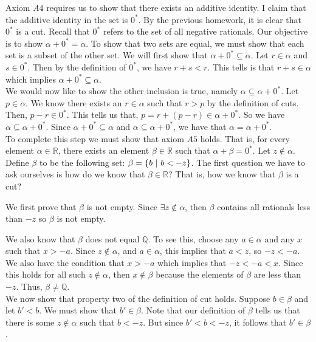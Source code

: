 \documentclass[12pt]{article}
\begin{document}
Axiom $A4$ requires us to show that there exists an additive identity. I claim that the additive identity in the set is $0^{*}$. By the previous homework, it is clear that $0^{*}$ is a cut. Recall that $0^{*}$ refers to the set of all negative rationals. Our objective is to show $\alpha + 0^{*} = \alpha$. To show that two sets are equal, we must show that each set is a subset of the other set. We will first show that $\alpha + 0^{*} \subseteq \alpha$. Let $r \in \alpha$ and $s \in 0^{*}$. Then by the definition of $0^{*}$, we have $r+s<r$. This tells is that $r+s \in \alpha$ which implies $\alpha + 0^{*}  \subseteq \alpha$. \\ 
We would now like to show the other inclusion is true, namely $\alpha \subseteq \alpha + 0^{*}$. Let $p \in \alpha$. We know there exists an $r \in \alpha$ such that $r>p$ by the definition of cuts. Then, $p-r \in 0^{*}$. This tells us that, $p = r +(p-r) \in \alpha + 0^{*}$. So we have $\alpha \subseteq \alpha + 0^{*}$. Since $\alpha + 0^{*}  \subseteq \alpha$ and $\alpha  \subseteq \alpha + 0^{*}$, we have that $\alpha = \alpha + 0^{*}$. \\ 

To complete this step we must show that axiom $A5$ holds. That is, for every element $\alpha \in \mathbb{R}$, there exists an element $\beta \in \mathbb{R}$ such that $\alpha + \beta = 0^{*}$. Let $z \notin \alpha$. Define $\beta$ to be the following set: $\beta = \left\{b~|~b<-z\right\}$.  The first question we have to ask ourselves is how do we know that $\beta \in \mathbb{R}$? That is, how we know that $\beta$ is a cut? 

We first prove that $\beta$  is not empty. Since $\exists z \notin \alpha$, then $\beta$ contains all rationals less than $-z$ so $\beta$ is not empty. 

\indent We also know that $\beta$ does not equal $\mathbb{Q}$. To see this, choose any $a \in \alpha$ and any $x$ such that $x>-a$. Since $z \notin \alpha$, and $a \in \alpha$, this implies that $a<z$, so $-z<-a$. We also have the condition that $x>-a$ which implies that $-z<-a<x$. Since this holds for all such $z \notin \alpha$, then $x \notin \beta$ because the elements of $\beta$ are less than $-z$. Thus, $\beta \neq \mathbb{Q}$. \\ 

We now show that property two of the definition of cut holds. Suppose $b \in \beta$ and let $b'<b$. We must show that $b' \in \beta$. Note that our definition of $\beta$ tells us that there is some $z \notin \alpha$ such that $b<-z$. But since $b'<b<-z$, it follows that $b' \in \beta$. \\ 
\end{document}
